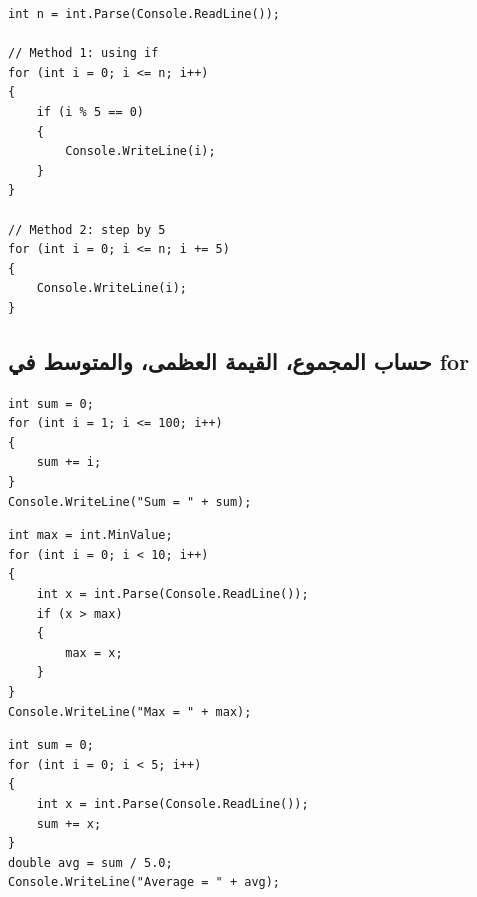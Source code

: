\documentclass[14pt]{extarticle}
\begin{document}
\filbreak
\begin{boxExample}
\begin{english}
\begin{verbatim}
int n = int.Parse(Console.ReadLine());

// Method 1: using if
for (int i = 0; i <= n; i++)
{
    if (i % 5 == 0)
    {
        Console.WriteLine(i);
    }
}

// Method 2: step by 5
for (int i = 0; i <= n; i += 5)
{
    Console.WriteLine(i);
}
\end{verbatim}
\end{english}
\end{boxExample}

\filbreak
\subsection{حساب المجموع، القيمة العظمى، والمتوسط في \textenglish{for}}

\begin{boxExample}
\begin{english}
\begin{verbatim}
int sum = 0;
for (int i = 1; i <= 100; i++)
{
    sum += i;
}
Console.WriteLine("Sum = " + sum);
\end{verbatim}
\end{english}
\end{boxExample}

\filbreak
\begin{boxExample}
\begin{english}
\begin{verbatim}
int max = int.MinValue;
for (int i = 0; i < 10; i++)
{
    int x = int.Parse(Console.ReadLine());
    if (x > max)
    {
        max = x;
    }
}
Console.WriteLine("Max = " + max);
\end{verbatim}
\end{english}
\end{boxExample}

\filbreak
\begin{boxExample}
\begin{english}
\begin{verbatim}
int sum = 0;
for (int i = 0; i < 5; i++)
{
    int x = int.Parse(Console.ReadLine());
    sum += x;
}
double avg = sum / 5.0;
Console.WriteLine("Average = " + avg);
\end{verbatim}
\end{english}
\end{boxExample}
\end{document}
